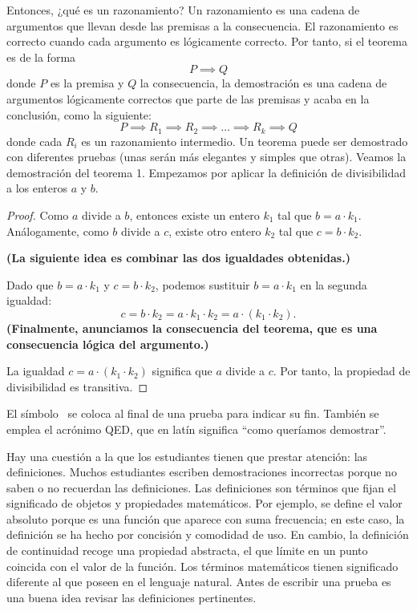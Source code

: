 Entonces, ¿qué es un razonamiento?
Un razonamiento es una cadena de argumentos que llevan desde las premisas a la consecuencia.
El razonamiento es correcto cuando cada argumento es lógicamente correcto.
Por tanto, si el teorema es de la forma
\[
    P \implies Q
\]
donde $P$ es la premisa y $Q$ la consecuencia, la demostración es una cadena de argumentos lógicamente correctos que parte de las premisas y acaba en la conclusión, como la siguiente:
\[
    P \implies R_1 \implies R_2 \implies \ldots \implies R_k \implies Q
\]
donde cada $R_i$ es un razonamiento intermedio.
Un teorema puede ser demostrado con diferentes pruebas (unas serán más elegantes y simples que otras).
Veamos la demostración del teorema 1.
Empezamos por aplicar la definición de divisibilidad a los enteros $a$ y $b$.
\begin{proof}
    Como $a$ divide a $b$, entonces existe un entero $k_1$ tal que $b = a \cdot k_1$.
    Análogamente, como $b$ divide a $c$, existe otro entero $k_2$ tal que $c = b \cdot k_2$.
    \par\textbf{\small(La siguiente idea es combinar las dos igualdades obtenidas.)}\par
    Dado que $b = a \cdot k_1$ y $c = b \cdot k_2$, podemos sustituir $b = a\cdot k_1$ en la segunda igualdad:
    \[
        c = b \cdot k_2 = a\cdot k_1 \cdot k_2 = a\cdot (k_1 \cdot k_2).
    \]
    \textbf{\small(Finalmente, anunciamos la consecuencia del teorema, que es una consecuencia lógica del argumento.)}\par
    La igualdad $c = a \cdot (k_1 \cdot k_2)$ significa que $a$ divide a $c$.
    Por tanto, la propiedad de divisibilidad es transitiva.
\end{proof}
El símbolo \qedsymbol\ se coloca al final de una prueba para indicar su fin.
También se emplea el acrónimo QED, que en latín significa “como queríamos demostrar”.

Hay una cuestión a la que los estudiantes tienen que prestar atención: las definiciones.
Muchos estudiantes escriben demostraciones incorrectas porque no saben o no recuerdan las definiciones.
Las definiciones son términos que fijan el significado de objetos y propiedades matemáticos.
Por ejemplo, se define el valor absoluto porque es una función que aparece con suma frecuencia; en este caso, la definición se ha hecho por concisión y comodidad de uso.
En cambio, la definición de continuidad recoge una propiedad abstracta, el que límite en un punto coincida con el valor de la función.
Los términos matemáticos tienen significado diferente al que poseen en el lenguaje natural.
Antes de escribir una prueba es una buena idea revisar las definiciones pertinentes.